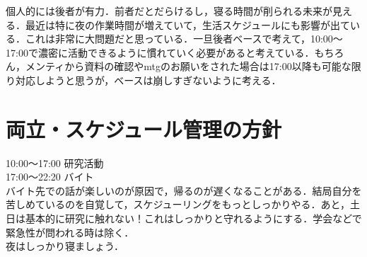 \documentclass[a4paper,12pt]{ltjsarticle}
\begin{document}
  個人的には後者が有力．前者だとだらけるし，寝る時間が削られる未来が見える．最近は特に夜の作業時間が増えていて，生活スケジュールにも影響が出ている．これは非常に大問題だと思っている．一旦後者ベースで考えて，10:00〜17:00で濃密に活動できるように慣れていく必要があると考えている．もちろん，メンティから資料の確認やmtgのお願いをされた場合は17:00以降も可能な限り対応しようと思うが，ベースは崩しすぎないように考える．\\

  \clearpage

  \section{両立・スケジュール管理の方針}
  10:00〜17:00 研究活動\\

  17:00〜22:20 バイト\\

  バイト先での話が楽しいのが原因で，帰るのが遅くなることがある．結局自分を苦しめているのを自覚して，スケジューリングをもっとしっかりやる．あと，土日は基本的に研究に触れない！これはしっかりと守れるようにする．学会などで緊急性が問われる時は除く．\\

  夜はしっかり寝ましょう．

  \clearpage
\end{document}
